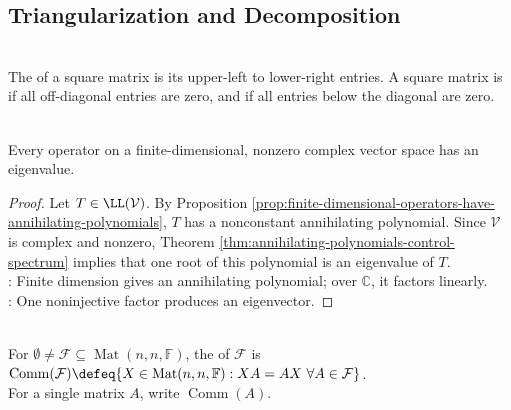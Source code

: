 \subsection{Triangularization and Decomposition}

\begin{definition} \label{def:diagonal-and-upper-triangular-matrices} \\
The  of a square matrix is its upper-left to lower-right entries. A square matrix is  if all off-diagonal entries are zero, and  if all entries below the diagonal are zero.
\end{definition}

\begin{theorem} \label{thm:complex-operator-has-eigenvalue} \\
Every operator on a finite-dimensional, nonzero complex vector space has an eigenvalue.
\begin{proof}
Let $T\in\LL(\mathcal{V})$. By Proposition \ref{prop:finite-dimensional-operators-have-annihilating-polynomials}, $T$ has a nonconstant annihilating polynomial. Since $\mathcal{V}$ is complex and nonzero, Theorem \ref{thm:annihilating-polynomials-control-spectrum} implies that one root of this polynomial is an eigenvalue of $T$.\\
: Finite dimension gives an annihilating polynomial; over $\mathbb{C}$, it factors linearly.\\
: One noninjective factor produces an eigenvector.
\end{proof}
\end{theorem}

\begin{definition} \label{def:matrix-commutant} \\
For $\emptyset\neq\mathcal{F}\subseteq\operatorname{Mat}(n,n,\mathbb{F})$, the  of $\mathcal{F}$ is $\operatorname{Comm}(\mathcal{F})\defeq\{X\in\operatorname{Mat}(n,n,\mathbb{F}): XA=AX\ \forall A\in\mathcal{F}\}$.\\
For a single matrix $A$, write $\operatorname{Comm}(A)$.
\end{definition}


